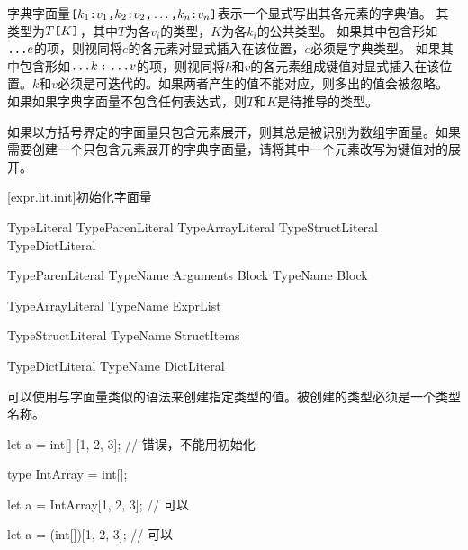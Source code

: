 \pnum
字典字面量$\texttt{[}k_1\texttt{:} v_1\texttt{,} k_2\texttt{:} v_2\texttt{,} \ldots\texttt{,} k_n\texttt{:} v_n\texttt{]}$表示一个显式写出其各元素的字典值。
其类型为$T\texttt{[}K\texttt{]}$，其中$T$为各$v_i$的类型，$K$为各$k_i$的公共类型。
如果其中包含形如$\texttt{...}e$的项，则视同将$e$的各元素对显式插入在该位置，$e$必须是字典类型。
如果其中包含形如$\texttt{...}k\mathbin{\texttt{:}}\texttt{...}v$的项，则视同将$k$和$v$的各元素组成键值对显式插入在该位置。$k$和$v$必须是可迭代的。如果两者产生的值不能对应，则多出的值会被忽略。
如果如果字典字面量不包含任何表达式，则$T$和$K$是待推导的类型。

\pnum
如果以方括号界定的字面量只包含元素展开，则其总是被识别为数组字面量。\enternote 如果需要创建一个只包含元素展开的字典字面量，请将其中一个元素改写为键值对的展开。\exitnote

[expr.lit.init]{初始化字面量}

\begin{bnf}{TypeLiteral}
    TypeParenLiteral \br
    TypeArrayLiteral \br
    TypeStructLiteral \br
    TypeDictLiteral
\end{bnf}

\begin{bnf}{TypeParenLiteral}
    TypeName \terminal{(} Arguments\bnfq \terminal{)} Block\bnfs \br
    TypeName Block
\end{bnf}

\begin{bnf}{TypeArrayLiteral}
    TypeName \terminal{[} ExprList\bnfq \terminal{]}
\end{bnf}

\begin{bnf}{TypeStructLiteral}
    TypeName \terminal{\{} StructItems\bnfq \terminal{\}}
\end{bnf}

\begin{bnf}{TypeDictLiteral}
    TypeName DictLiteral
\end{bnf}

\pnum
可以使用与字面量类似的语法来创建指定类型的值。被创建的类型必须是一个类型名称。

\enterexample
\begin{codeblock}

let a = int[] [1, 2, 3]; // 错误，不能用\tcode{[]}初始化

type IntArray = int[];

let a = IntArray[1, 2, 3]; // 可以

let a = (int[])[1, 2, 3]; // 可以

\end{codeblock}
\exitexample

